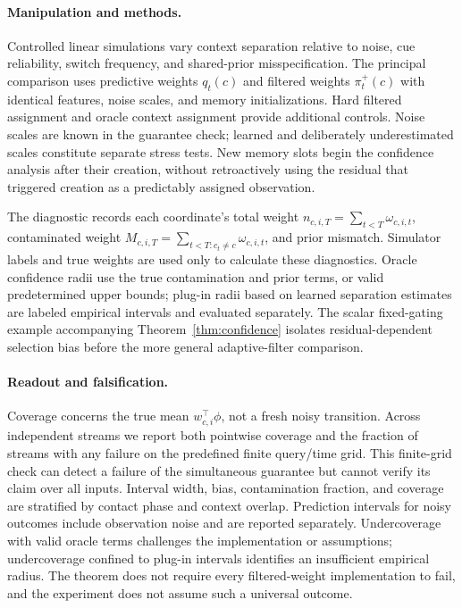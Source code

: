 \paragraph{Manipulation and methods.}
Controlled linear simulations vary context separation relative to noise, cue reliability, switch frequency, and shared-prior misspecification. The principal comparison uses predictive weights $q_t(c)$ and filtered weights $\pi_t^+(c)$ with identical features, noise scales, and memory initializations. Hard filtered assignment and oracle context assignment provide additional controls. Noise scales are known in the guarantee check; learned and deliberately underestimated scales constitute separate stress tests. New memory slots begin the confidence analysis after their creation, without retroactively using the residual that triggered creation as a predictably assigned observation.

The diagnostic records each coordinate's total weight $n_{c,i,T}=\sum_{t<T}\omega_{c,i,t}$, contaminated weight $M_{c,i,T}=\sum_{t<T:c_t\ne c}\omega_{c,i,t}$, and prior mismatch. Simulator labels and true weights are used only to calculate these diagnostics. Oracle confidence radii use the true contamination and prior terms, or valid predetermined upper bounds; plug-in radii based on learned separation estimates are labeled empirical intervals and evaluated separately. The scalar fixed-gating example accompanying Theorem~\ref{thm:confidence} isolates residual-dependent selection bias before the more general adaptive-filter comparison.

\paragraph{Readout and falsification.}
Coverage concerns the true mean $w_{c,i}^{\top}\phi$, not a fresh noisy transition. Across independent streams we report both pointwise coverage and the fraction of streams with any failure on the predefined finite query/time grid. This finite-grid check can detect a failure of the simultaneous guarantee but cannot verify its claim over all inputs. Interval width, bias, contamination fraction, and coverage are stratified by contact phase and context overlap. Prediction intervals for noisy outcomes include observation noise and are reported separately. Undercoverage with valid oracle terms challenges the implementation or assumptions; undercoverage confined to plug-in intervals identifies an insufficient empirical radius. The theorem does not require every filtered-weight implementation to fail, and the experiment does not assume such a universal outcome.

